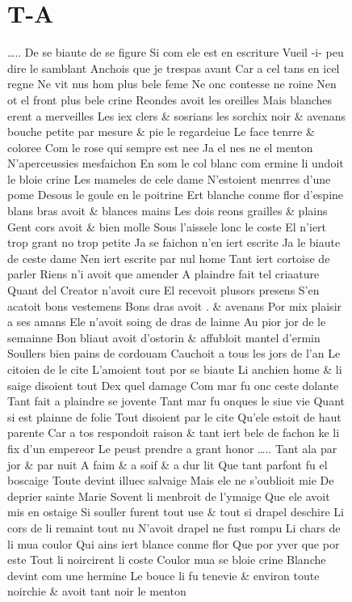 \documentclass[
  letterpaper,
  DIV=11,
  numbers=noendperiod,
  oneside]{scrreprt}
\begin{document}
\begin{figure}

\section{T-A}\label{t-a}

\ldots.. De se biaute de se figure Si com ele est en escriture Vueil -i-
peu dire le samblant Anchois que je trespas avant Car a cel tans en icel
regne Ne vit nus hom plus bele feme Ne onc contesse ne roine Nen ot el
front plus bele crine Reondes avoit les oreilles Mais blanches erent a
merveilles Les iex clers \& sosrians les sorchix noir \& avenans bouche
petite par mesure \& pie le regardeiue Le face tenrre \& coloree Com le
rose qui sempre est nee Ja el nes ne el menton N'aperceussies mesfaichon
En som le col blanc com ermine li undoit le bloie crine Les mameles de
cele dame N'estoient menrres d'une pome Desous le goule en le poitrine
Ert blanche conme flor d'espine blans bras avoit \& blances mains Les
dois reons grailles \& plains Gent cors avoit \& bien molle Sous
l'aissele lonc le coste El n'iert trop grant no trop petite Ja se
faichon n'en iert escrite Ja le biaute de ceste dame Nen iert escrite
par nul home Tant iert cortoise de parler Riens n'i avoit que amender A
plaindre fait tel criaature Quant del Creator n'avoit cure El recevoit
plusors presens S'en acatoit bons vestemens Bons dras avoit . \& avenans
Por mix plaisir a ses amans Ele n'avoit soing de dras de lainne Au pior
jor de le semainne Bon bliaut avoit d'ostorin \& affubloit mantel
d'ermin Soullers bien pains de cordouam Cauchoit a tous les jors de l'an
Le citoien de le cite L'amoient tout por se biaute Li anchien home \& li
saige disoient tout Dex quel damage Com mar fu onc ceste dolante Tant
fait a plaindre se jovente Tant mar fu onques le siue vie Quant si est
plainne de folie Tout disoient par le cite Qu'ele estoit de haut parente
Car a tos respondoit raison \& tant iert bele de fachon ke li fix d'un
empereor Le peust prendre a grant honor \ldots.. Tant ala par jor \& par
nuit A faim \& a soif \& a dur lit Que tant parfont fu el boscaige Toute
devint illuec salvaige Mais ele ne s'oublioit mie De deprier sainte
Marie Sovent li menbroit de l'ymaige Que ele avoit mis en ostaige Si
souller furent tout use \& tout si drapel deschire Li cors de li remaint
tout nu N'avoit drapel ne fust rompu Li chars de li mua coulor Qui ains
iert blance conme flor Que por yver que por este Tout li noircirent li
coste Coulor mua se bloie crine Blanche devint com une hermine Le bouce
li fu tenevie \& environ toute noirchie \& avoit tant noir le menton

\end{figure}
\end{document}
